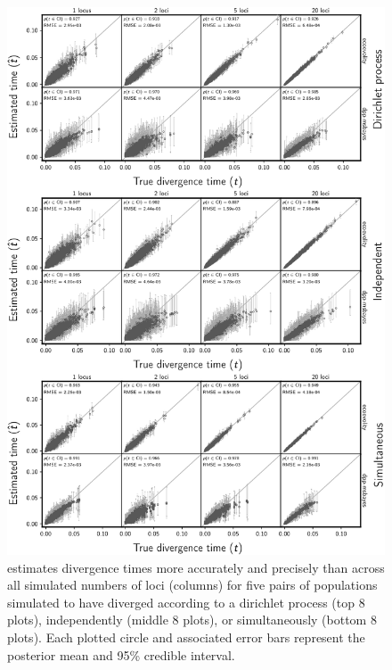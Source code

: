 \clearpage

\begin{figure}[htbp]
    \begin{center}
        \includegraphics[width=\textwidth,height=0.9\textheight,keepaspectratio]{../images/from-project-repo/plots/tex-plot-grids/grid-div-time-scatter-cropped.pdf}
        \caption{
            \scriptsize
            \Ecoevolity estimates divergence times more accurately
            and precisely than \dppmsbayes across all simulated
            numbers of loci (columns) for five pairs of populations simulated
            to have diverged according to a dirichlet process (top 8 plots),
            independently (middle 8 plots),
            or simultaneously (bottom 8 plots).
            Each plotted circle and associated error bars represent the posterior mean
            and 95\% credible interval.
            \accuracyscatterplotannotations{\comparisonetime{}}
        }
        \label{fig:divtimescatter}
    \end{center}
\end{figure}

